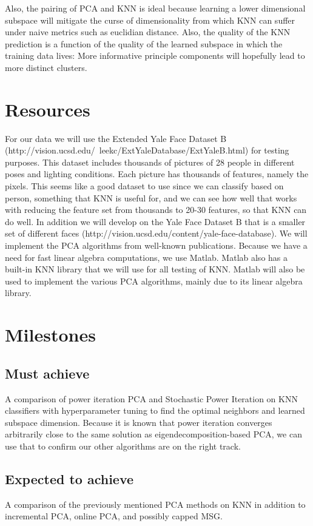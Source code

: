 \documentclass[11pt]{article}
\begin{document}
Also, the pairing of PCA and KNN is ideal because learning a lower dimensional subspace will mitigate the curse of dimensionality from which KNN can suffer under naive metrics such as euclidian distance. Also, the quality of the KNN prediction is a function of the quality of the learned subspace in which the training data lives: More informative principle components will hopefully lead to more distinct clusters. 


\section{Resources}
For our data we will use the Extended Yale Face Dataset B \\ 
(http://vision.ucsd.edu/~leekc/ExtYaleDatabase/ExtYaleB.html) for testing purposes. This dataset includes thousands of pictures of 28 people in different poses and lighting conditions. Each picture has thousands of features, namely the pixels. This seems like a good dataset to use since we can classify based on person, something that KNN is useful for, and we can see how well that works with reducing the feature set from thousands to 20-30 features, so that KNN can do well. In addition we will develop on the Yale Face Dataset B that is a smaller set of different faces (http://vision.ucsd.edu/content/yale-face-database).  We will implement the PCA algorithms from well-known publications. Because we have a need for fast linear algebra computations, we use Matlab. Matlab also has a built-in KNN library that we will use for all testing of KNN. Matlab will also be used to implement the various PCA algorithms, mainly due to its linear algebra library. 


\section{Milestones}
\subsection{Must achieve}
A comparison of power iteration PCA and Stochastic Power Iteration on KNN classifiers with hyperparameter tuning to find the optimal neighbors and learned subspace dimension. Because it is known that power iteration converges arbitrarily close to the same solution as eigendecomposition-based PCA, we can use that to confirm our other algorithms  are on the right track. 
\subsection{Expected to achieve}
A comparison of the previously mentioned PCA methods on KNN in addition to incremental PCA, online PCA,  and possibly capped MSG.
\end{document}
